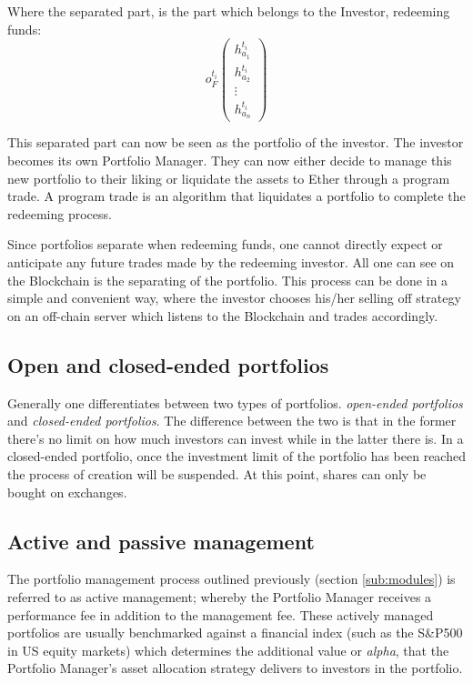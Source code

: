 \documentclass[9pt,oneside]{amsart}
\theoremstyle{plain}
\begin{document}
\begin{multicols}{2}
Where the separated part, is the part which belongs to the Investor, redeeming funds:
\begin{equation*}
	o_{F}^{t_i}
	\begin{pmatrix}
		h_{a_{1}}^{t_i}\\
		h_{a_{2}}^{t_i}\\
		\vdots \\
		h_{a_{n}}^{t_i}
	\end{pmatrix}
\end{equation*}

This separated part can now be seen as the portfolio of the investor. The investor becomes its own Portfolio Manager. They can now either decide to manage this new portfolio to their liking or liquidate the assets to Ether through a program trade. A program trade is an algorithm that liquidates a portfolio to complete the redeeming process.

Since portfolios separate when redeeming funds, one cannot directly expect or anticipate any future trades made by the redeeming investor. All one can see on the Blockchain is the separating of the portfolio. This process can be done in a simple and convenient way, where the investor chooses his/her selling off strategy on an off-chain server which listens to the Blockchain and trades accordingly.

\subsection{Open and closed-ended portfolios}\label{sub:closed}

Generally one differentiates between two types of portfolios. \textit{open-ended portfolios} and \textit{closed-ended portfolios}. The difference between the two is that in the former there's no limit on how much investors can invest while in the latter there is. In a closed-ended portfolio, once the investment limit of the portfolio has been reached the process of creation will be suspended. At this point, shares can only be bought on exchanges.

\subsection{Active and passive management}\label{sub:activepassive}

The portfolio management process outlined previously (section \ref{sub:modules}) is referred to as active management; whereby the Portfolio Manager receives a performance fee in addition to the management fee. These actively managed portfolios are usually benchmarked against a financial index (such as the S\&P500 in US equity markets) which determines the additional value or \textit{alpha}, that the Portfolio Manager's asset allocation strategy delivers to investors in the portfolio. 


\end{multicols}
\end{document}
